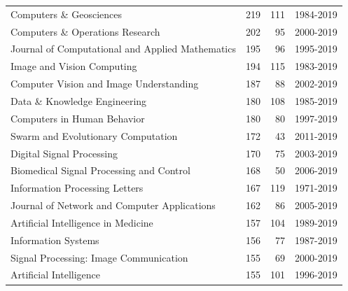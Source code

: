 \documentclass[12pt]{article}
\begin{document}
\begin{center}
{\begin{longtable}{lrrl}
			Computers \& Geosciences                                                             &       219 &      111 & 1984-2019 \\
			Computers \& Operations Research                                                     &       202 &       95 & 2000-2019 \\
			Journal of Computational and Applied Mathematics                                     &       195 &       96 & 1995-2019 \\
			Image and Vision Computing                                                           &       194 &      115 & 1983-2019 \\
			Computer Vision and Image Understanding                                              &       187 &       88 & 2002-2019 \\
			Data \& Knowledge Engineering                                                        &       180 &      108 & 1985-2019 \\
			Computers in Human Behavior                                                          &       180 &       80 & 1997-2019 \\
			Swarm and Evolutionary Computation                                                   &       172 &       43 & 2011-2019 \\
			Digital Signal Processing                                                            &       170 &       75 & 2003-2019 \\
			Biomedical Signal Processing and Control                                             &       168 &       50 & 2006-2019 \\
			Information Processing Letters                                                       &       167 &      119 & 1971-2019 \\
			Journal of Network and Computer Applications                                         &       162 &       86 & 2005-2019 \\
			Artificial Intelligence in Medicine                                                  &       157 &      104 & 1989-2019 \\
			Information Systems                                                                  &       156 &       77 & 1987-2019 \\
			Signal Processing: Image Communication                                               &       155 &       69 & 2000-2019 \\
			Artificial Intelligence                                                              &       155 &      101 & 1996-2019 \\

\end{longtable}}
\end{center}
\end{document}
